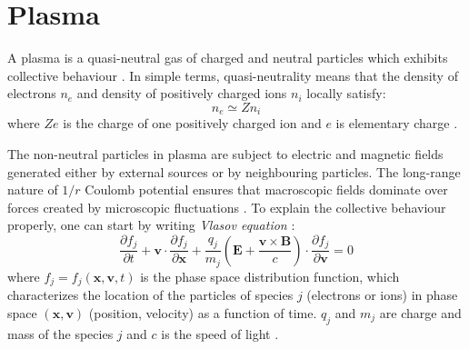 \chapter{Plasma}
A plasma is a quasi-neutral gas of charged and neutral particles which exhibits collective behaviour \cite{plasma-intro3}. In simple terms, quasi-neutrality means that the density of electrons $n_e$ and density of positively charged ions $n_i$ locally satisfy:
\begin{equation}
	n_e \simeq Zn_i
\end{equation}
\noindent where $Ze$ is the charge of one positively charged ion and $e$ is elementary charge \cite{plasma-intro}. 

The non-neutral particles in plasma are subject to electric and magnetic fields generated either by external sources or by neighbouring particles. The long-range nature of $1/r$ Coulomb potential ensures that macroscopic fields dominate over forces created by microscopic fluctuations \cite{plasma-intro}. To explain the collective behaviour properly, one can start by writing \textit{Vlasov equation} \cite{laser-plasma4}:
\begin{equation}
	\frac{\partial f_j}{\partial t} + \bm{v} \cdot \frac{\partial f_j}{\partial \bm{x}} + \frac{q_j}{m_j}\left(\bm{E} + \frac{\bm{v}\times\bm{B}}{c}\right)\cdot \frac{\partial f_j}{\partial \bm{v}} = 0
\end{equation}
\noindent where $f_j = f_j\left(\bm{x},\bm{v},t\right)$ is the phase space distribution function, which characterizes the location of the particles of species $j$ (electrons or ions) in phase space $\left(\bm{x},\bm{v}\right)$ (position, velocity) as a function of time. $q_j$ and $m_j$ are charge and mass of the species $j$ and $c$ is the speed of light \cite{laser-plasma4}.

